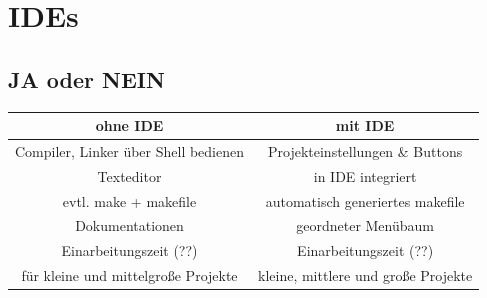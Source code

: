 \documentclass[a4paper]{report}
\begin{document}

\section{IDEs}
\subsection{JA oder NEIN}
\begin{center}
\begin{tabular}{|c||c|}
	\hline
	\textbf{ohne IDE} & \textbf{mit IDE} \\
	\hline \hline
	Compiler, Linker über Shell bedienen	&	Projekteinstellungen \& Buttons \\
	Texteditor				&		in IDE integriert\\
	evtl. make + makefile	&	automatisch generiertes makefile \\
	Dokumentationen & geordneter Menübaum \\
	\hline \hline
	Einarbeitungszeit (??) & Einarbeitungszeit (??) \\
	für kleine und mittelgroße Projekte & kleine, mittlere und große Projekte \\
	\hline
\end{tabular}
\end{center}
\end{document}
